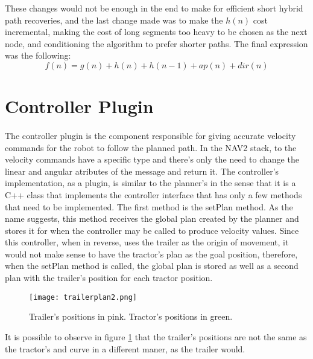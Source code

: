 These changes would not be enough in the end to make for efficient short hybrid path recoveries, 
and the last change made was to make the $h(n)$ cost incremental, making the cost 
of long segments too heavy to be chosen as the next node, and conditioning the 
algorithm to prefer shorter paths. The final expression was the following:
$$f(n) = g(n) + h(n) + h(n-1) + ap(n) + dir(n)$$


\section{Controller Plugin}
\label{sec:controller_plugin}
\paragraph{}The controller plugin is the component responsible for giving accurate 
velocity commands for the robot to follow the planned path. In the \gls{NAV2} stack, 
to the velocity commands have a specific type and there's only the need to change the linear 
and angular atributes of the message and return it. The controller's implementation, as a 
plugin, is similar to the planner's in the sense that it is a C++ class that 
implements the controller interface that has only a few methods that need to be implemented. 
The first method is the setPlan method. As the name suggests, this method receives the 
global plan created by the planner and stores it for when the controller may be called to 
produce velocity values. Since this controller, when in reverse, uses the trailer as the 
origin of movement, it would not make sense to have the tractor's plan as the goal 
position, therefore, when the setPlan method is called, the global plan is stored as well as 
a second plan with the trailer's position for each tractor position.

\begin{figure}[h]
    \centering
    \texttt{[image: trailerplan2.png]}
    \caption{Trailer's positions in pink. Tractor's positions in green.}
    \label{fig:trailerplan}
\end{figure}

It is possible to observe in figure \ref{fig:trailerplan} that the trailer's 
positions are not the same as the tractor's and curve in a different maner, as the trailer 
would.

